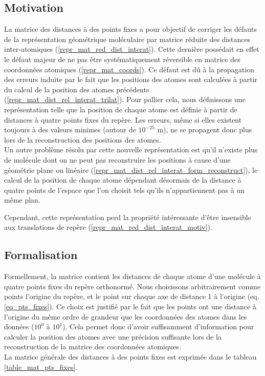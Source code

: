 \label{repr_mat_pts_fixes}

\subsection{Motivation}
\par La matrice des distances à des points fixes a pour objectif de corriger les défauts de la représentation géométrique moléculaire par matrice réduite des distances inter-atomiques (\ref{repr_mat_red_dist_interat}). Cette dernière possédait en effet le défaut majeur de ne pas être systématiquement réversible en matrice des coordonnées atomiques (\ref{repr_mat_coords}). Ce défaut est dû à la propagation des erreurs induite par le fait que les positions des atomes sont calculées à partir du calcul de la position des atomes précédents (\ref{repr_mat_dist_rel_interat_trilat}). Pour pallier cela, nous définissons une représentation telle que la position de chaque atome est définie à partir de distances à quatre points fixes du repère. Les erreurs, même si elles existent toujours à des valeurs minimes (autour de $10^{-25}$ m), ne se propagent donc plus lors de la reconstruction des positions des atomes.\\
Un autre problème résolu par cette nouvelle représentation est qu'il n'existe plus de molécule dont on ne peut pas reconstruire les positions à cause d'une géométrie plane ou linéaire (\ref{repr_mat_dist_rel_interat_form_reconstruct}), le calcul de la position de chaque atome dépendant désormais de la distance à quatre points de l'espace que l'on choisit tels qu'ils n'appartiennent pas à un même plan.\\
\par Cependant, cette représentation perd la propriété intéressante d'être insensible aux translations de repère (\ref{repr_mat_red_dist_interat_motiv}).
\subsection{Formalisation}
\par Formellement, la matrice contient les distances de chaque atome d'une molécule à quatre points fixes du repère orthonormé. Nous choisissons arbitrairement comme points l'origine du repère, et le point sur chaque axe de distance 1 à l'origine (eq. \ref{eq_pts_fixes}). Ce choix est justifié par le fait que les points ont une distance à l'origine du même ordre de grandeur que les coordonnées des atomes dans les données ($10^0$ à $10^1$). Cela permet donc d'avoir suffisamment d'information pour calculer la position des atomes avec une précision suffisante lors de la reconstruction de la matrice des coordonnées atomiques.\\
La matrice générale des distances à des points fixes est exprimée dans le tableau \ref{table_mat_pts_fixes}.

